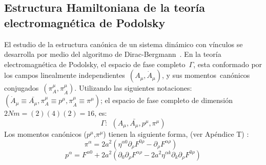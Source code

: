\documentclass[a4paper,12pt]{article}
\begin{document}
\subsection{Estructura Hamiltoniana de la teoría electromagnética de Podolsky}
El estudio de la estructura canónica de un sistema dinámico con \mbox{vínculos} se \mbox{desarrolla} por medio del algoritmo de \mbox{Dirac-Bergmann \mbox{\cite{dirac,puebla,Merilin}}.} En la teoría electromagnética de Podolsky, el espacio de fase \mbox{completo $\Gamma$,} \mbox{esta} conformado por los campos linealmente \mbox{independientes $(A_\mu,\dot A_\mu)$,} y sus \mbox{momentos canónicos} \mbox{conjugados $(\pi_A^\mu,\pi_{\dot A}^\mu)$.} Utilizando las \mbox{siguientes} \mbox{notaciones:} \mbox{$(\dot A_\mu\equiv\bar{A_\mu},\pi_A^\mu\equiv p^\mu,\pi_{\dot A}^\mu\equiv\pi^\mu)$;} el espacio de fase completo de \mbox{dimensión $2Nm=(2)(4)(2)=16$,} es:
\begin{equation}
\Gamma: \ \ (A_\mu,\bar{A_\mu},p^\mu,\pi^\mu) 
\end{equation}
Los momentos canónicos ($p^\mu$,$\pi^\mu$) tienen la siguiente forma, (ver Apéndice T) \cite{podolsky,forhaljdpo}:
\begin{equation}
\pi^{\alpha}= 2a^2(\eta^{\alpha0}\partial_\rho F^{0\rho}-\partial_\rho F^{\alpha\rho}) \ \ \ 
\label{mca}
\end{equation}
\begin{equation}
p^\alpha=F^{\alpha0}+2a^2(\partial_0\partial_\rho F^{\alpha\rho}-2a^2\eta^{\alpha k}\partial_k\partial_\rho F^{0\rho})   
\label{mcb}
\end{equation}
\end{document}
